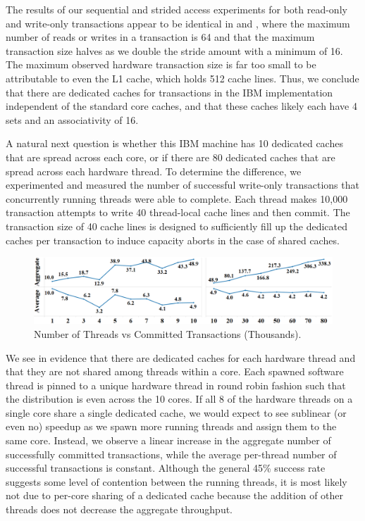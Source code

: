 The results of our sequential and strided access experiments for 
both read-only and write-only
transactions appear to be identical in  and
, where
the maximum number of reads or writes in a transaction
is 64 and that the maximum transaction size 
halves as we double the stride amount with a minimum
of 16.  The maximum observed hardware transaction size is far too
small to be attributable to even the {L1} cache, which holds 512 cache
lines.   Thus, we conclude that there are dedicated caches 
for transactions in the IBM implementation independent
of the standard core caches, and that
these caches likely each have 4 sets and an associativity of 16.

A natural next question is whether this IBM machine 
has 10 dedicated caches that
are spread across each core, or if there are 80 
dedicated caches that are spread
across each hardware thread. To determine the 
difference, we experimented and
measured the number of successful write-only 
transactions that concurrently
running threads were able to complete. Each 
thread makes 10,000 transaction
attempts to write 40 thread-local cache 
lines and then commit. The
transaction size of 40 cache lines is designed 
to sufficiently fill up the
dedicated caches per transaction to induce capacity 
aborts in the case of shared
caches.

\begin{figure}[H]%
\centering
\includegraphics[width=\linewidth]{images/wttm_core_or_thread_ibm}
\caption{Number of Threads vs Committed Transactions (Thousands).}
\label{fig:wttm_core_or_thread_ibm}
\end{figure}

We see in  
evidence that there are dedicated caches for each hardware 
thread and that they are not shared among
threads within a core. Each spawned
software thread is pinned to a unique hardware thread 
in round robin fashion
such that the distribution is even across the 10 cores. 
If all 8 of the
hardware threads on a single core share a single 
dedicated cache, we would
expect to see sublinear (or even no) speedup as we spawn
more running threads and assign them to the same core. 
Instead, we observe a
linear increase in the aggregate number of successfully 
committed transactions,
while the average per-thread number of successful 
transactions is constant.
Although the general 45\% success rate suggests some 
level of contention between
the running threads, it is most likely not due to 
per-core sharing of a
dedicated cache because the addition of other threads does
not decrease the aggregate throughput.
 



